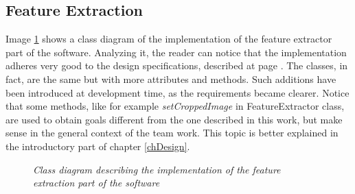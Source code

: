 \newpage
		\subsection{Feature Extraction}
		Image \ref{fig:impl_feat_extraction} shows a class diagram of the implementation of the feature extractor part of the software. 
		Analyzing it, the reader can notice that the implementation adheres very good to the design specifications, described at page \pageref{featExtraction}. 
		The classes, in fact, are the same but with more attributes and methods. 
		Such additions have been introduced at development time, as the requirements became clearer.
		Notice that some methods, like for example \emph{setCroppedImage} in FeatureExtractor class, are used to obtain goals different from the one described in this work, but make sense in the general context of the team work. This topic is better explained in the introductory part of chapter \ref{chDesign}. 

		\begin{figure}[h]
		  \begin{center} 
		  \end{center} 
		  \caption{\textit{Class diagram describing the implementation of the feature extraction part of the software}}  
		  \label{fig:impl_feat_extraction}
	 	\end{figure}	


